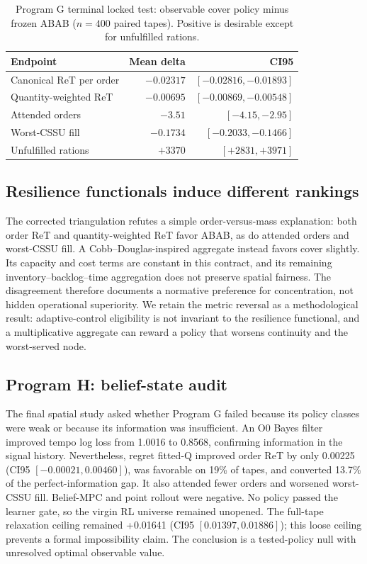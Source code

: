 \begin{table}[htbp]
\centering
\caption{Program G terminal locked test: observable cover policy minus frozen ABAB
($n=400$ paired tapes). Positive is desirable except for unfulfilled rations.}
\label{tab:programg}
\small
\begin{tabular}{lrr}
\toprule
Endpoint & Mean delta & CI95 \\
\midrule
Canonical ReT per order & $-0.02317$ & $[-0.02816,-0.01893]$ \\
Quantity-weighted ReT & $-0.00695$ & $[-0.00869,-0.00548]$ \\
Attended orders & $-3.51$ & $[-4.15,-2.95]$ \\
Worst-CSSU fill & $-0.1734$ & $[-0.2033,-0.1466]$ \\
Unfulfilled rations & $+3370$ & $[+2831,+3971]$ \\
\bottomrule
\end{tabular}
\end{table}

\subsection{Resilience functionals induce different rankings}

The corrected triangulation refutes a simple order-versus-mass explanation: both order ReT and
quantity-weighted ReT favor ABAB, as do attended orders and worst-CSSU fill. A
Cobb--Douglas-inspired aggregate instead favors cover slightly. Its capacity and cost terms are
constant in this contract, and its remaining inventory--backlog--time aggregation does not
preserve spatial fairness. The disagreement therefore documents a normative preference for
concentration, not hidden operational superiority. We retain the metric reversal as a
methodological result: adaptive-control eligibility is not invariant to the resilience
functional, and a multiplicative aggregate can reward a policy that worsens continuity and the
worst-served node.

\subsection{Program H: belief-state audit}

The final spatial study asked whether Program G failed because its policy classes were weak or
because its information was insufficient. An O0 Bayes filter improved tempo log loss from
1.0016 to 0.8568, confirming information in the signal history. Nevertheless, regret fitted-Q
improved order ReT by only 0.00225 (CI95 $[-0.00021,0.00460]$), was favorable on 19\% of
tapes, and converted 13.7\% of the perfect-information gap. It also attended fewer orders and
worsened worst-CSSU fill. Belief-MPC and point rollout were negative. No policy passed the
learner gate, so the virgin RL universe remained unopened. The full-tape relaxation ceiling
remained +0.01641 (CI95 $[0.01397,0.01886]$); this loose ceiling prevents a formal
impossibility claim. The conclusion is a tested-policy null with unresolved optimal observable
value.
